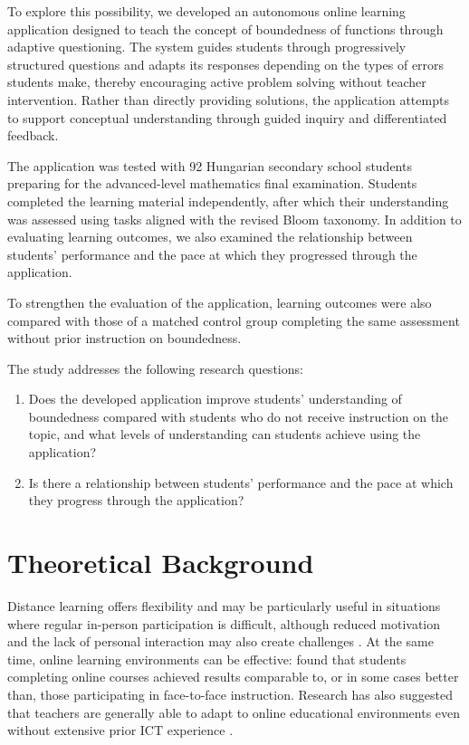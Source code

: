 \documentclass[11pt]{article}
\begin{document}
To explore this possibility, we developed an autonomous online learning application designed to teach the concept of boundedness of functions through adaptive questioning. The system guides students through progressively structured questions and adapts its responses depending on the types of errors students make, thereby encouraging active problem solving without teacher intervention. Rather than directly providing solutions, the application attempts to support conceptual understanding through guided inquiry and differentiated feedback.

The application was tested with 92 Hungarian secondary school students preparing for the advanced-level mathematics final examination. Students completed the learning material independently, after which their understanding was assessed using tasks aligned with the revised Bloom taxonomy. In addition to evaluating learning outcomes, we also examined the relationship between students' performance and the pace at which they progressed through the application.

To strengthen the evaluation of the application, learning outcomes were also compared with those of a matched control group completing the same assessment without prior instruction on boundedness.

The study addresses the following research questions:

\begin{enumerate}
    \item Does the developed application improve students' understanding of boundedness compared with students who do not receive instruction on the topic, and what levels of understanding can students achieve using the application?

    \item Is there a relationship between students' performance and the pace at which they progress through the application?
\end{enumerate}

\section{Theoretical Background}

Distance learning offers flexibility and may be particularly useful in situations where regular in-person participation is difficult, although reduced motivation and the lack of personal interaction may also create challenges \citep{Galusha1997}. At the same time, online learning environments can be effective: \citet{Soffer2018} found that students completing online courses achieved results comparable to, or in some cases better than, those participating in face-to-face instruction. Research has also suggested that teachers are generally able to adapt to online educational environments even without extensive prior ICT experience \citep{Spoel2020}.
\end{document}
